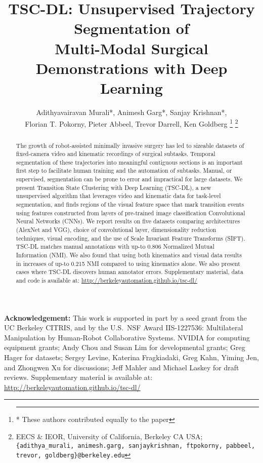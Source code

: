 \documentclass[letterpaper, 10 pt, conference]{ieeeconf}
\title{\LARGE \bf
TSC-DL: Unsupervised Trajectory Segmentation of \\
Multi-Modal Surgical Demonstrations with Deep Learning}
\author{%
Adithyavairavan Murali*, Animesh Garg*, Sanjay Krishnan*,\\ Florian T. Pokorny,
Pieter Abbeel, Trevor Darrell, Ken Goldberg%
\thanks{\hrule \vspace{5pt} * These authors contributed equally to the paper}%
\thanks{EECS \& IEOR, University of California, Berkeley CA USA; \texttt{\{adithya\_murali, animesh.garg, sanjaykrishnan, ftpokorny, pabbeel, trevor, goldberg\}@berkeley.edu}}%
}
\newcommand{\tsc}{TSC-DL\xspace}
\begin{document}
\maketitle

\begin{abstract}
The growth of robot-assisted minimally invasive surgery has led to sizeable datasets of fixed-camera video and kinematic recordings of surgical subtasks.
Temporal segmentation of these trajectories into meaningful contiguous sections is an important first step to facilitate human training and the automation of subtasks.  
Manual, or supervised, segmentation can be prone to error and impractical for large datasets. 
We present Transition State Clustering with Deep Learning (\tsc), a new unsupervised algorithm that leverages video and kinematic data for task-level segmentation, and finds regions of the visual feature space that mark transition events using features constructed from layers of pre-trained image classification Convolutional Neural Networks (CNNs).
We report results on five datasets comparing architectures (AlexNet and VGG), choice of convolutional layer, dimensionality reduction techniques, visual encoding, and the use of Scale Invariant Feature Transforms (SIFT).
\tsc matches manual annotations with up-to 0.806 Normalized Mutual Information (NMI).
We also found that using both kinematics and visual data results in increases of up-to 0.215 NMI compared to using kinematics alone.
We also present cases where \tsc discovers human annotator errors.
Supplementary material, data and code is available at: 
\href{http://berkeleyautomation.github.io/tsc-dl/}{http://berkeleyautomation.github.io/tsc-dl/}
\end{abstract} 










\vspace{2pt}

{\footnotesize 
\noindent \textbf{Acknowledgement:}
This work is supported in part by a seed grant from the UC Berkeley CITRIS, and by the U.S.\ NSF Award IIS-1227536: Multilateral Manipulation by Human-Robot Collaborative Systems.  NVIDIA for computing equipment grants; Andy Chou and Susan Lim for developmental grants; Greg Hager for datasets; Sergey Levine, Katerina Fragkiadaki, Greg Kahn, Yiming Jen, and Zhongwen Xu for discussions; Jeff Mahler and Michael Laskey for draft reviews.
Supplementary material is available at:
\href{http://berkeleyautomation.github.io/tsc-dl/}{http://berkeleyautomation.github.io/tsc-dl/}
}




\end{document}
